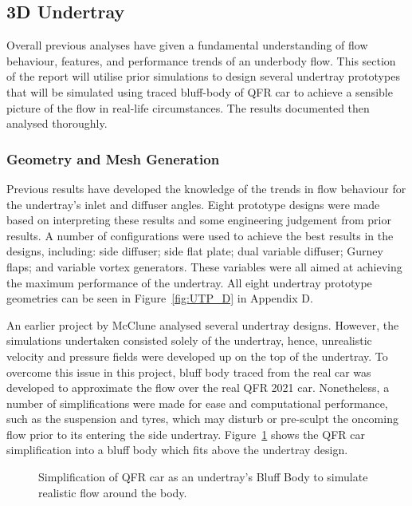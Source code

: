 
\subsection{3D Undertray}
Overall previous analyses have given a fundamental understanding of flow behaviour, features, and performance trends of an underbody flow. This section of the report will utilise prior simulations to design several undertray prototypes that will be simulated using traced bluff-body of QFR car to achieve a sensible picture of the flow in real-life circumstances. The results documented then analysed thoroughly.

\subsubsection{Geometry and Mesh Generation}
\noindent Previous results have developed the knowledge of the trends in flow behaviour for the undertray's inlet and diffuser angles. Eight prototype designs were made based on interpreting these results and some engineering judgement from prior results. A number of configurations were used to achieve the best results in the designs, including: side diffuser; side flat plate; dual variable diffuser; Gurney flaps; and variable vortex generators. These variables were all aimed at achieving the maximum performance of the undertray. All eight undertray prototype geometries can be seen in Figure~\ref{fig:UTP_D} in Appendix D.


\noindent An earlier project by McClune \cite{McClune2018DesignCar} analysed several undertray designs. However, the simulations undertaken consisted solely of the undertray, hence, unrealistic velocity and pressure fields were developed up on the top of the undertray. To overcome this issue in this project, bluff body traced from the real car was developed to approximate the flow over the real QFR 2021 car. Nonetheless, a number of simplifications were made for ease and computational performance, such as the suspension and tyres, which may disturb or pre-sculpt the oncoming flow prior to its entering the side undertray. Figure~\ref{fig:3D_UT_BB_SIMPLIFICATION} shows the QFR car simplification into a bluff body which fits above the undertray design.

\begin{figure}[!htb] 
    \centering
    \noindent{}
    \caption{Simplification of QFR car as an undertray's Bluff Body to simulate realistic flow around the body.}
      \label{fig:3D_UT_BB_SIMPLIFICATION}
\end{figure}

